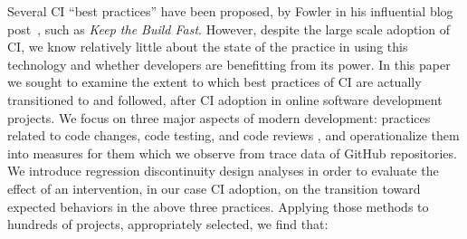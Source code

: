 Several CI ``best practices'' have been proposed, \eg by Fowler in his 
influential blog post~\cite{fowler2000continuous}, such as \emph{Keep 
the Build Fast}.
However, despite the large scale adoption of CI, we know relatively little 
about the state of the practice in using this technology and whether 
developers are benefitting from its power.
In this paper we sought to examine the extent to which best practices 
of CI are actually transitioned to and followed, after CI adoption in online 
software development projects. 
We focus on three major aspects of modern development: practices 
related to code changes, code testing, and code reviews , and 
operationalize them into measures for them which we observe from 
trace data of GitHub repositories.
We introduce regression discontinuity design analyses in order to 
evaluate the effect of an intervention, in our case CI adoption, on the 
transition toward expected behaviors in the above three practices.
Applying those methods to hundreds of projects, appropriately selected, 
we find that:





